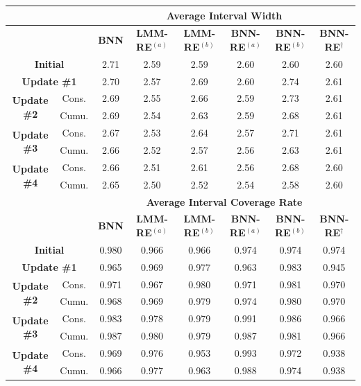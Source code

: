 \begin{tabular}{cc|cccccc}
\hline
 & & \multicolumn{6}{c}{\textbf{Average Interval Width}} \\
\hline
 & & \textbf{BNN} & \textbf{LMM-RE}$^{(a)}$ & \textbf{LMM-RE}$^{(b)}$ & \textbf{BNN-RE}$^{(a)}$ & \textbf{BNN-RE}$^{(b)}$ & \textbf{BNN-RE}$^{\dagger}$ \\
\hline
\multicolumn{2}{c|}{\textbf{Initial}} & 2.71 & 2.59 & 2.59 & 2.60 & 2.60 & 2.60 \\
\multicolumn{2}{c|}{\textbf{Update \#1}} & 2.70 & 2.57 & 2.69 & 2.60 & 2.74 & 2.61 \\
\multirow{2}{*}{\textbf{Update \#2}} & Cons. & 2.69 & 2.55 & 2.66 & 2.59 & 2.73 & 2.61 \\
 & Cumu. & 2.69 & 2.54 & 2.63 & 2.59 & 2.68 & 2.61 \\
\multirow{2}{*}{\textbf{Update \#3}} & Cons. & 2.67 & 2.53 & 2.64 & 2.57 & 2.71 & 2.61 \\
 & Cumu. & 2.66 & 2.52 & 2.57 & 2.56 & 2.63 & 2.61 \\
\multirow{2}{*}{\textbf{Update \#4}} & Cons. & 2.66 & 2.51 & 2.61 & 2.56 & 2.68 & 2.60 \\
 & Cumu. & 2.65 & 2.50 & 2.52 & 2.54 & 2.58 & 2.60 \\
\hline
 & & \multicolumn{6}{c}{\textbf{Average Interval Coverage Rate}} \\
\hline
 & & \textbf{BNN} & \textbf{LMM-RE}$^{(a)}$ & \textbf{LMM-RE}$^{(b)}$ & \textbf{BNN-RE}$^{(a)}$ & \textbf{BNN-RE}$^{(b)}$ & \textbf{BNN-RE}$^{\dagger}$ \\
\hline
\multicolumn{2}{c|}{\textbf{Initial}} & 0.980 & 0.966 & 0.966 & 0.974 & 0.974 & 0.974 \\
\multicolumn{2}{c|}{\textbf{Update \#1}} & 0.965 & 0.969 & 0.977 & 0.963 & 0.983 & 0.945 \\
\multirow{2}{*}{\textbf{Update \#2}} & Cons. & 0.971 & 0.967 & 0.980 & 0.971 & 0.981 & 0.970 \\
 & Cumu. & 0.968 & 0.969 & 0.979 & 0.974 & 0.980 & 0.970 \\
\multirow{2}{*}{\textbf{Update \#3}} & Cons. & 0.983 & 0.978 & 0.979 & 0.991 & 0.986 & 0.966 \\
 & Cumu. & 0.987 & 0.980 & 0.979 & 0.987 & 0.981 & 0.966 \\
\multirow{2}{*}{\textbf{Update \#4}} & Cons. & 0.969 & 0.976 & 0.953 & 0.993 & 0.972 & 0.938 \\
 & Cumu. & 0.966 & 0.977 & 0.963 & 0.988 & 0.974 & 0.938 \\
\hline
\end{tabular}